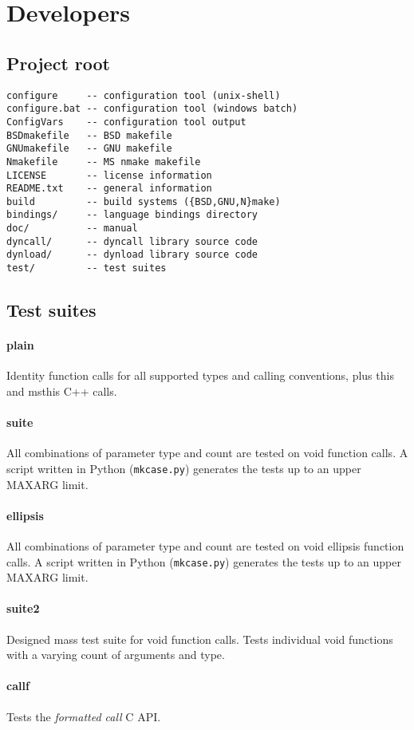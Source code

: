 \newpage
\section{Developers}

\subsection{Project root}
\begin{verbatim}
configure     -- configuration tool (unix-shell)
configure.bat -- configuration tool (windows batch)
ConfigVars    -- configuration tool output
BSDmakefile   -- BSD makefile
GNUmakefile   -- GNU makefile
Nmakefile     -- MS nmake makefile
LICENSE       -- license information
README.txt    -- general information
build         -- build systems ({BSD,GNU,N}make)
bindings/     -- language bindings directory
doc/          -- manual
dyncall/      -- dyncall library source code
dynload/      -- dynload library source code
test/         -- test suites
\end{verbatim}

\subsection{Test suites}

\paragraph{plain}

Identity function calls for all supported types and calling conventions,
plus this and msthis C++ calls.

\paragraph{suite}

All combinations of parameter type and count are tested on void function calls.
A script written in Python ({\tt mkcase.py}) generates the tests up to
an upper MAXARG limit.

\paragraph{ellipsis}

All combinations of parameter type and count are tested on void ellipsis 
function calls. A script written in Python ({\tt mkcase.py}) generates the 
tests up to an upper MAXARG limit.

\paragraph{suite2}

Designed mass test suite for void function calls.
Tests individual void functions with a varying count of arguments and type.

\paragraph{callf}

Tests the \emph{formatted call}  C API.

